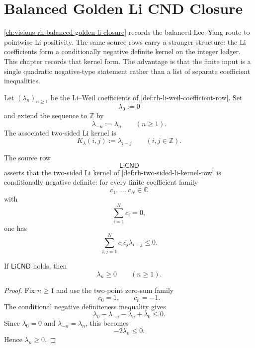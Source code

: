 \chapter{Balanced Golden Li CND Closure}
\label{ch:visions-rh-balanced-golden-li-cnd-closure}

\autoref{ch:visions-rh-balanced-golden-li-closure} records the balanced
Lee--Yang route to pointwise Li positivity.  The same source rows carry
a stronger structure: the Li coefficients form a conditionally negative
definite kernel on the integer ledger.  This chapter records that kernel
form.  The advantage is that the finite input is a single quadratic
negative-type statement rather than a list of separate coefficient
inequalities.

\begin{definition}
\label{def:rh-two-sided-li-kernel-row}
Let $(\lambda_n)_{n\ge1}$ be the Li--Weil coefficients of
\autoref{def:rh-li-weil-coefficient-row}.  Set
$$
\lambda_0:=0
$$
and extend the sequence to $\mathbb Z$ by
$$
\lambda_{-n}:=\lambda_n
\qquad
(n\ge1).
$$
The associated two-sided Li kernel is
$$
K_{\lambda}(i,j):=\lambda_{i-j}
\qquad
(i,j\in\mathbb Z).
$$
\end{definition}

\begin{definition}
\label{def:rh-li-conditional-negative-definiteness}
The source row
$$
\mathsf{LiCND}
$$
asserts that the two-sided Li kernel of
\autoref{def:rh-two-sided-li-kernel-row} is conditionally negative
definite: for every finite coefficient family
$$
c_1,\ldots,c_N\in\mathbb C
$$
with
$$
\sum_{i=1}^N c_i=0,
$$
one has
$$
\sum_{i,j=1}^N
c_i\overline{c_j}\lambda_{i-j}
\le0.
$$
\end{definition}

\begin{theorem}
\label{thm:rh-li-cnd-gives-pointwise-li-positivity}
If $\mathsf{LiCND}$ holds, then
$$
\lambda_n\ge0
\qquad
(n\ge1).
$$
\end{theorem}

\begin{proof}
Fix $n\ge1$ and use the two-point zero-sum family
$$
c_0=1,
\qquad
c_n=-1.
$$
The conditional negative definiteness inequality gives
$$
\lambda_0-\lambda_{-n}-\lambda_n+\lambda_0\le0.
$$
Since $\lambda_0=0$ and $\lambda_{-n}=\lambda_n$, this becomes
$$
-2\lambda_n\le0.
$$
Hence $\lambda_n\ge0$.
\end{proof}

